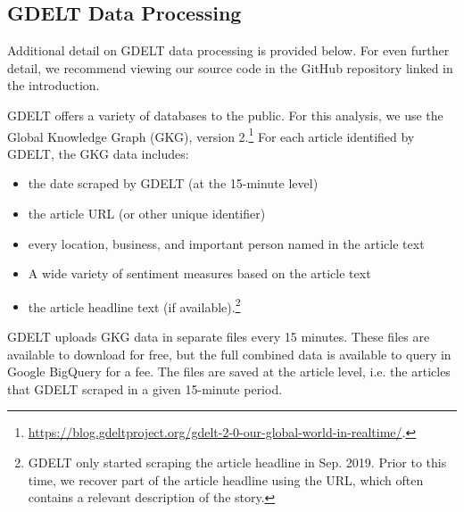 \documentclass[12pt]{article}
\begin{document}
\subsection{GDELT Data Processing}
\label{section:gdelt_details}
Additional detail on GDELT data processing is provided below. For even further detail, we recommend viewing our source code in the GitHub repository linked in the introduction.

GDELT offers a variety of databases to the public. For this analysis, we use the Global Knowledge Graph (GKG), version 2.\footnote{\url{https://blog.gdeltproject.org/gdelt-2-0-our-global-world-in-realtime/}.} For each article identified by GDELT, the GKG data includes:
\begin{itemize}
\singlespacing
    \item the date scraped by GDELT (at the 15-minute level)
    \item the article URL (or other unique identifier)
    \item every location, business, and important person named in the article text
    \item A wide variety of sentiment measures based on the article text
    \item the article headline text (if available).\footnote{GDELT only started scraping the article headline in Sep. 2019. Prior to this time, we recover part of the article headline using the URL, which often contains a relevant description of the story.}
\end{itemize}
GDELT uploads GKG data in separate files every 15 minutes. These files are available to download for free, but the full combined data is available to query in Google BigQuery for a fee. The files are saved at the article level, i.e. the articles that GDELT scraped in a given 15-minute period.
\end{document}
